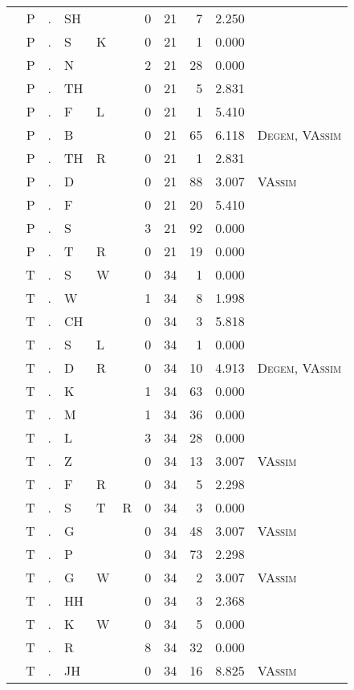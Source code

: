 \begin{longtable}{r@{ } r@{ } c@{ } l@{ } l@{ } l@{ } r r r r l }
 & P & . & SH &  &  & 0 & 21 & 7 & 2.250 &  \\
 & P & . & S & K &  & 0 & 21 & 1 & 0.000 &  \\
 & P & . & N &  &  & 2 & 21 & 28 & 0.000 &  \\
 & P & . & TH &  &  & 0 & 21 & 5 & 2.831 &  \\
 & P & . & F & L &  & 0 & 21 & 1 & 5.410 &  \\
 & P & . & B &  &  & 0 & 21 & 65 & 6.118 & \textsc{Degem}, \textsc{VAssim} \\
 & P & . & TH & R &  & 0 & 21 & 1 & 2.831 &  \\
 & P & . & D &  &  & 0 & 21 & 88 & 3.007 & \textsc{VAssim} \\
 & P & . & F &  &  & 0 & 21 & 20 & 5.410 &  \\
 & P & . & S &  &  & 3 & 21 & 92 & 0.000 &  \\
 & P & . & T & R &  & 0 & 21 & 19 & 0.000 &  \\
 & T & . & S & W &  & 0 & 34 & 1 & 0.000 &  \\
 & T & . & W &  &  & 1 & 34 & 8 & 1.998 &  \\
 & T & . & CH &  &  & 0 & 34 & 3 & 5.818 &  \\
 & T & . & S & L &  & 0 & 34 & 1 & 0.000 &  \\
 & T & . & D & R &  & 0 & 34 & 10 & 4.913 & \textsc{Degem}, \textsc{VAssim} \\
 & T & . & K &  &  & 1 & 34 & 63 & 0.000 &  \\
 & T & . & M &  &  & 1 & 34 & 36 & 0.000 &  \\
 & T & . & L &  &  & 3 & 34 & 28 & 0.000 &  \\
 & T & . & Z &  &  & 0 & 34 & 13 & 3.007 & \textsc{VAssim} \\
 & T & . & F & R &  & 0 & 34 & 5 & 2.298 &  \\
 & T & . & S & T & R & 0 & 34 & 3 & 0.000 &  \\
 & T & . & G &  &  & 0 & 34 & 48 & 3.007 & \textsc{VAssim} \\
 & T & . & P &  &  & 0 & 34 & 73 & 2.298 &  \\
 & T & . & G & W &  & 0 & 34 & 2 & 3.007 & \textsc{VAssim} \\
 & T & . & HH &  &  & 0 & 34 & 3 & 2.368 &  \\
 & T & . & K & W &  & 0 & 34 & 5 & 0.000 &  \\
 & T & . & R &  &  & 8 & 34 & 32 & 0.000 &  \\
 & T & . & JH &  &  & 0 & 34 & 16 & 8.825 & \textsc{VAssim} \\

\end{longtable}
